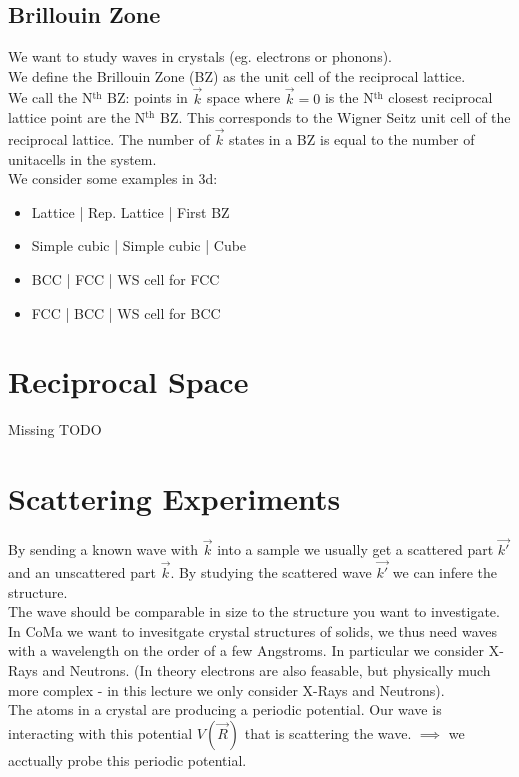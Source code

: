 \documentclass{report}
\begin{document}
\section{Brillouin Zone}
We want to study waves in crystals (eg. electrons or phonons). \\
We define the Brillouin Zone (BZ) as the unit cell of the reciprocal lattice. \\
We call the N$^{\text{th}}$ BZ: points in $\vec{k}$ space where $\vec{k} = 0$ is the N$^{\text{th}}$ closest reciprocal lattice point are the N$^{\text{th}}$ BZ. This corresponds to the Wigner Seitz unit cell of the reciprocal lattice.
The number of $\vec{k}$ states in a BZ is equal to the number of unitacells in the system. \\
We consider some examples in 3d:\\
\begin{itemize}
	\item Lattice		| Rep. Lattice 	| First BZ
	\item Simple cubic 	| Simple cubic 	| Cube
	\item BCC		| FCC		| WS cell for FCC
	\item FCC		| BCC		| WS cell for BCC
\end{itemize}
\chapter{Reciprocal Space}
Missing TODO
\chapter{Scattering Experiments}
By sending a known wave with $\vec{k}$ into a sample we usually get a scattered part $\vec{k'}$ and an unscattered part $\vec{k}$. By studying the scattered wave $\vec{k'}$ we can infere the structure.\\
The wave should be comparable in size to the structure you want to investigate.  In CoMa we want to invesitgate crystal structures of solids, we thus need waves with a wavelength on the order of a few Angstroms. In particular we consider X-Rays and Neutrons. (In theory electrons are also feasable, but physically much more complex - in this lecture we only consider X-Rays and Neutrons).\\
The atoms in a crystal are producing a periodic potential. Our wave is interacting  with this potential $V(\vec{R})$ that is scattering the wave. $\implies$ we acctually probe this periodic potential.\\
\end{document}
